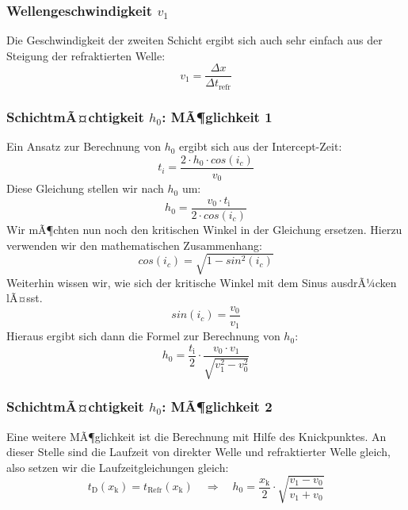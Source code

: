 \subsubsection{Wellengeschwindigkeit $v_1$}
Die Geschwindigkeit der zweiten Schicht ergibt sich auch sehr einfach aus der Steigung der refraktierten Welle: \begin{equation*}
	v_1 = \frac{\Delta x}{\Delta t_{\text{refr}}}
\end{equation*}

\subsubsection{SchichtmÃ¤chtigkeit $h_0$: MÃ¶glichkeit 1}
Ein Ansatz zur Berechnung von $h_0$ ergibt sich aus der Intercept-Zeit: \begin{equation*}
	t_i = \frac{2 \cdot h_0 \cdot cos(i_c)}{v_0}
\end{equation*}
Diese Gleichung stellen wir nach $h_0$ um: \begin{equation*}
	h_0 = \frac{v_0 \cdot t_{\text{i}}}{2 \cdot cos(i_c)}
\end{equation*}
Wir mÃ¶chten nun noch den kritischen Winkel in der Gleichung ersetzen. Hierzu verwenden wir den mathematischen Zusammenhang: \begin{equation*}
	cos(i_c) = \sqrt{1 - sin^2(i_c)} 
\end{equation*} 
Weiterhin wissen wir, wie sich der kritische Winkel mit dem Sinus ausdrÃ¼cken lÃ¤sst. \begin{equation*}
	sin(i_c) = \frac{v_0}{v_1}
\end{equation*}
Hieraus ergibt sich dann die Formel zur Berechnung von $h_0$: \begin{equation*}
	h_0 = \frac{t_{\text{i}}}{2} \cdot \frac{v_0 \cdot v_1}{\sqrt{v_1^2 - v_0^2}}
\end{equation*}


\subsubsection{SchichtmÃ¤chtigkeit $h_0$: MÃ¶glichkeit 2}
Eine weitere MÃ¶glichkeit ist die Berechnung mit Hilfe des Knickpunktes. An dieser Stelle sind die Laufzeit von direkter Welle und refraktierter Welle gleich, also setzen wir die Laufzeitgleichungen gleich: \begin{equation*}
	t_{\text{D}}(x_{\text{k}}) = t_{\text{Refr}}(x_{\text{k}}) \quad \Rightarrow \quad h_0 = \frac{x_{\text{k}}}{2} \cdot \sqrt{\frac{v_1 - v_0}{v_1 + v_0}}
\end{equation*}


